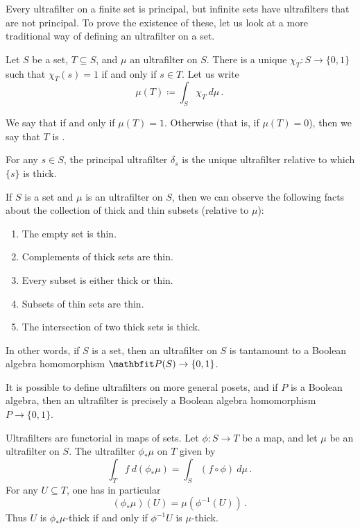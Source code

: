 Every ultrafilter on a finite set is principal,
but infinite sets have ultrafilters that are not principal.
To prove the existence of these, let us look at a more traditional way of defining an ultrafilter on a set.

\begin{dfn}
	Let $ S $ be a set, $ T \subseteq S$, and $ \mu $ an ultrafilter on $ S $.
	There is a unique  $ \chi_T \colon S \to \{ 0,1 \}$ such that $ \chi_T(s) = 1 $ if and only if $ s \in T $.
	Let us write
	\[
		\mu(T) \coloneq \int_S \chi_T \ d \mu \period
	\]
	
	We say that  if and only if $\mu(T) = 1$.
	Otherwise (that is, if $ \mu(T) = 0 $), then we say that $ T $ is .

	For any $ s \in S$, the principal ultrafilter $ \delta_s $ is the unique ultrafilter relative to which $ \{ s \} $ is thick.
\end{dfn}

\begin{nul}
	If $ S $ is a set and $ \mu $ is an ultrafilter on $ S $, then we can observe the following facts about the collection of thick and thin subsets (relative to $ \mu $):
	\begin{enumerate}[(1)]
		\item The empty set is thin.
		\item Complements of thick sets are thin.
		\item Every subset is either thick or thin.
		\item Subsets of thin sets are thin.
		\item The intersection of two thick sets is thick.
	\end{enumerate}
	In other words, if $ S $ is a set, then an ultrafilter on $ S $ is tantamount to a Boolean algebra homomorphism $ \PP(S) \to \{0,1\} $.

	It is possible to define ultrafilters on more general posets, and if $ P $ is a Boolean algebra, then an ultrafilter is precisely a Boolean algebra homomorphism $ P \to \{0, 1\} $.
\end{nul}

\begin{nul}
	Ultrafilters are functorial in maps of sets.
	Let $ \phi \colon S \to T $ be a map, and let $ \mu $ be an ultrafilter on $ S $.
	The ultrafilter $ \phi_{\ast}\mu $ on $ T $ given by
	\[
		\int_T f \ d (\phi_{\ast}\mu) = \int_S (f \circ \phi) \ d \mu \period
	\]
	For any $ U \subseteq T$, one has in particular
	\[
		(\phi_{\ast} \mu)(U) = \mu (\phi^{-1}(U)) \period
	\]
	Thus $ U $ is $ \phi_{\ast} \mu $-thick if and only if $ \phi^{-1} U $ is $ \mu $-thick.
\end{nul}

